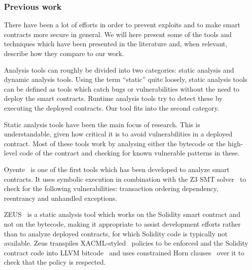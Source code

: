 
\subsubsection{Previous work}
There have been a lot of efforts in order to prevent exploits and to make smart contracts more secure in general.
We will here present some of the tools and techniques which have been presented in the literature and, when relevant, describe how they compare to our work.

Analysis tools can roughly be divided into two categories: static analysis and dynamic analysis tools.
Using the term ``static'' quite loosely, static analysis tools can be defined as tools which catch bugs or vulnerabilities without the need to deploy the smart contracts.
Runtime analysis tools try to detect these by executing the deployed contracts.
Our tool fits into the second category.

 Static analysis tools have been the main focus of research.
This is understandable, given how critical it is to avoid vulnerabilities in a deployed contract.
Most of these tools work by analysing either the bytecode or the high-level code of the contract and checking for known vulnerable patterns in these.

Oyente~\cite{luu2016a} is one of the first tools which has been developed to analyze smart contracts.
It uses symbolic execution in combination with the Z3 SMT solver~\cite{de2008z3} to check for the following vulnerabilities: transaction ordering dependency, reentrancy and unhandled exceptions.

ZEUS~\cite{DBLP:conf/ndss/KalraGDS18} is a static analysis tool which works on the Solidity smart contract and not on the bytecode, making it appropriate to assist development efforts rather than to analyze deployed contracts, for which Solidity code is typically not available.
Zeus transpiles XACML-styled~\cite{XACML} policies to be enforced and the Solidity contract code into LLVM bitcode~\cite{lattner2004llvm} and uses constrained Horn clauses~\cite{bjorner2012program,mcmillan2007interpolants} over it to check that the policy is respected.

